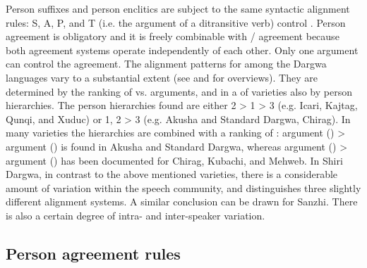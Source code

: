 Person suffixes and person enclitics are subject to the same syntactic alignment rules: S, A, P, and T (i.e. the  argument of a ditransitive verb) control . Person agreement is obligatory and it is freely combinable with / agreement because both agreement systems operate independently of each other. Only one argument can control the agreement. The alignment patterns for  among the Dargwa languages vary to a substantial extent (see \citealp{Sumbatova2011} and  for overviews). They are determined by the ranking of  vs.  arguments, and in a  of varieties also by person hierarchies. The person hierarchies found are either 2 > 1 > 3 (e.g. Icari, Kajtag, Qunqi, and Xuduc) or 1, 2 > 3 (e.g. Akusha and Standard Dargwa, Chirag). In many varieties the hierarchies are combined with a ranking of :  argument () >  argument () is found in Akusha and Standard Dargwa, whereas  argument () >  argument () has been documented for Chirag, Kubachi, and Mehweb. In Shiri Dargwa, in contrast to the above mentioned varieties, there is a considerable amount of variation within the speech community, and \citet{Belyaev2013} distinguishes three slightly different alignment systems. A similar conclusion can be drawn for Sanzhi. There is also a certain degree of intra- and inter-speaker variation.



\subsection{Person agreement rules}
\label{ssec:Person agreement rules}


